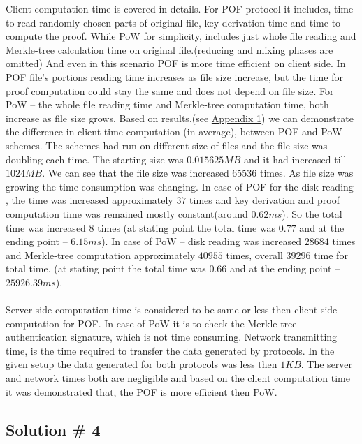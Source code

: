\documentclass[12pt]{article}
\begin{document}
Client computation time is covered in details. For POF protocol it includes, time to read randomly chosen parts of original file, key derivation time and time to compute the proof. While PoW for simplicity, includes just whole file reading and Merkle-tree calculation time on original file.(reducing and mixing phases are omitted) And even in this scenario POF is more time efficient on client side. In POF file's portions reading time increases as file size increase, but the time for proof computation could stay the same and does not depend on file size. For PoW -- the whole file reading time and Merkle-tree computation time, both increase as file size grows. Based on results,(see \hyperref[Appendix 1] {Appendix 1})  we can demonstrate  the difference in client time computation (in average), between POF and PoW schemes. The schemes had run on different size of files and the file size was doubling each time. The starting size was $0.015625MB$ and it had increased till $1024MB$. We can see that the file size was increased 65536 times. As file size was growing the time consumption was changing. In case of POF  for the disk reading , the time was increased approximately $37$ times and key derivation and  proof computation time was remained mostly constant(around $0.62 ms$). So the total time was increased $8$ times (at stating point the total time was $0.77$ and at the ending point -- $6.15 ms$). In case of PoW -- disk reading was increased $28684$ times and Merkle-tree computation approximately $40955$ times, overall $39296$ time for total time. (at stating point the total time was $0.66$ and at the ending point -- $25926.39 ms$). \\\\
Server side computation time is considered to be same or less then client side computation for POF. In case of PoW it is to check the Merkle-tree authentication signature, which is not time consuming. Network transmitting time, is the time required to transfer the data generated by protocols. In the given setup the data generated for both protocols was less then $1KB$. The server and network times both are negligible and based on the client computation time it was demonstrated that, the POF is more efficient then PoW.

\subsection{Solution \# 4}
\label{sub:Soltuion4}
\end{document}
